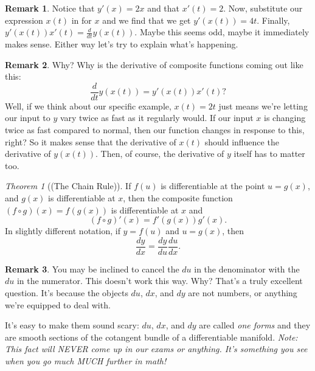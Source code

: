 \documentclass[leqno]{article}
\theoremstyle{definition}
\newtheorem{remark}{Remark}[section]
\theoremstyle{remark}
\theoremstyle{theorem}
\newtheorem{theorem}{Theorem}[section]
\begin{document}
\begin{remark}
Notice that $y'(x)=2x$ and that $x'(t)=2$.  Now, substitute our expression $x(t)$ in for $x$ and we find that we get $y'(x(t))=4t$.  Finally, $y'(x(t))x'(t)=\frac{d}{dt}y(x(t))$.  Maybe this seems odd, maybe it immediately makes sense.  Either way let's try to explain what's happening.
\end{remark}

\begin{remark}
Why? Why is the derivative of composite functions coming out like this:
\[
\frac{d}{dt} y(x(t)) = y'(x(t))x'(t)?
\]
Well, if we think about our specific example, $x(t)=2t$ just means we're letting our input to $y$ vary twice as fast as it regularly would.  If our input $x$ is changing twice as fast compared to normal, then our function changes in response to this, right? So it makes sense that the derivative of $x(t)$ should influence the derivative of $y(x(t))$.  Then, of course, the derivative of $y$ itself has to matter too.
\end{remark}

\begin{theorem}[(The Chain Rule)]
If $f(u)$ is differentiable at the point $u=g(x)$, and $g(x)$ is differentiable at $x$, then the composite function $(f\circ g)(x)=f(g(x))$ is differentiable at $x$ and
\[
(f\circ g)'(x)=f'(g(x))g'(x).
\]
In slightly different notation, if $y=f(u)$ and $u=g(x)$, then
\[
\frac{dy}{dx}=\frac{dy}{du}\frac{du}{dx}.
\]
\end{theorem}

\begin{remark}
You may be inclined to cancel the $du$ in the denominator with the $du$ in the numerator.  This doesn't work this way.  Why? That's a truly excellent question.  It's because the objects $du$, $dx$, and $dy$ are not numbers, or anything we're equipped to deal with.  

It's easy to make them sound scary: $du$, $dx$, and $dy$ are called \emph{one forms} and they are smooth sections of the cotangent bundle of a differentiable manifold. \emph{Note: This fact will NEVER come up in our exams or anything.  It's something you see when you go much MUCH further in math!} 
\end{remark}
\end{document}
